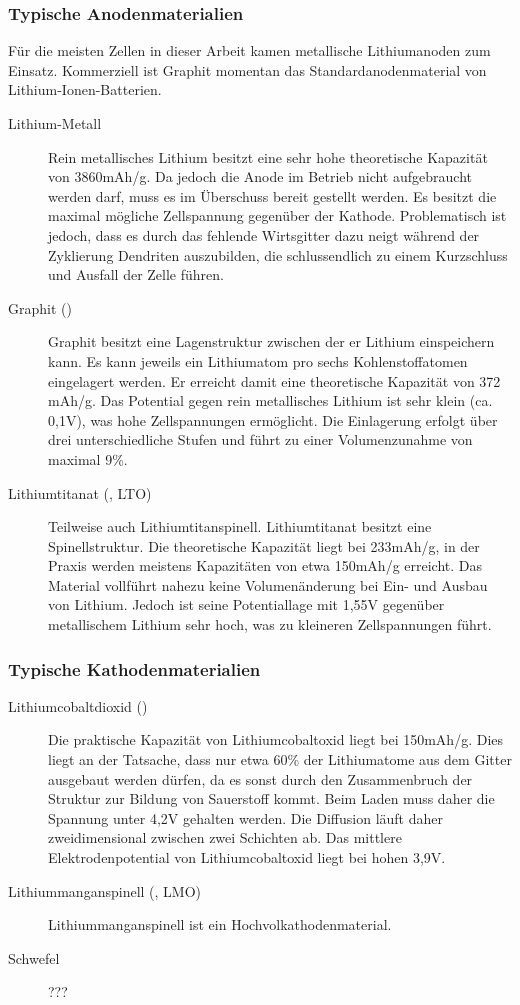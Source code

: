 \documentclass[a4paper, 11pt, headsepline,footsepline,twoside,abstract]{scrbook}
\begin{document}
\subsubsection{Typische Anodenmaterialien}
Für die meisten Zellen in dieser Arbeit kamen metallische Lithiumanoden zum Einsatz. Kommerziell ist Graphit momentan das Standardanodenmaterial von Lithium-Ionen-Batterien.
\begin{description}
\item[Lithium-Metall] Rein metallisches Lithium besitzt eine sehr hohe theoretische Kapazität von 3860mAh/g. Da jedoch die Anode im Betrieb nicht aufgebraucht werden darf, muss es im Überschuss bereit gestellt werden. Es besitzt die maximal mögliche Zellspannung gegenüber der Kathode. Problematisch ist jedoch, dass es durch das fehlende Wirtsgitter dazu neigt während der Zyklierung Dendriten auszubilden, die schlussendlich zu einem Kurzschluss und Ausfall der Zelle führen.
\item[Graphit ()] Graphit besitzt eine Lagenstruktur zwischen der er Lithium einspeichern kann. Es kann jeweils ein Lithiumatom pro sechs Kohlenstoffatomen eingelagert werden. Er erreicht damit eine theoretische Kapazität von 372 mAh/g. Das Potential gegen rein metallisches Lithium ist sehr klein (ca. 0,1V), was hohe Zellspannungen ermöglicht. Die Einlagerung erfolgt über drei unterschiedliche Stufen und führt zu einer Volumenzunahme von maximal 9\%.
\item[Lithiumtitanat (, LTO)] Teilweise auch Lithiumtitanspinell. Lithiumtitanat besitzt eine Spinellstruktur. Die theoretische Kapazität liegt bei 233mAh/g, in der Praxis werden meistens Kapazitäten von etwa 150mAh/g erreicht. Das Material vollführt nahezu keine Volumenänderung bei Ein- und Ausbau von Lithium. Jedoch ist seine Potentiallage mit 1,55V gegenüber metallischem Lithium sehr hoch, was zu kleineren Zellspannungen führt.
\end{description}
\subsubsection{Typische Kathodenmaterialien}
\begin{description}
\item[Lithiumcobaltdioxid ()] Die praktische Kapazität von Lithiumcobaltoxid liegt bei 150mAh/g. Dies liegt an der Tatsache, dass nur etwa 60\% der Lithiumatome aus dem Gitter ausgebaut werden dürfen, da es sonst durch den Zusammenbruch der Struktur zur Bildung von Sauerstoff kommt. Beim Laden muss daher die Spannung unter 4,2V gehalten werden. Die Diffusion läuft daher zweidimensional zwischen zwei Schichten ab. Das mittlere Elektrodenpotential von Lithiumcobaltoxid liegt bei hohen 3,9V.
\item[Lithiummanganspinell (, LMO)] Lithiummanganspinell ist ein Hochvolkathodenmaterial. %
\item[Schwefel] ???
\end{description}
\end{document}
